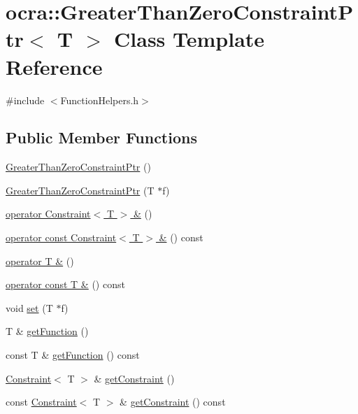 \hypertarget{classocra_1_1GreaterThanZeroConstraintPtr}{}\section{ocra\+:\+:Greater\+Than\+Zero\+Constraint\+Ptr$<$ T $>$ Class Template Reference}
\label{classocra_1_1GreaterThanZeroConstraintPtr}


{\ttfamily \#include $<$Function\+Helpers.\+h$>$}

\subsection*{Public Member Functions}
\begin{DoxyCompactItemize}
\item 
\hyperlink{classocra_1_1GreaterThanZeroConstraintPtr_a37dc1b390edf7f0bbc3d3a8774edff12}{Greater\+Than\+Zero\+Constraint\+Ptr} ()
\item 
\hyperlink{classocra_1_1GreaterThanZeroConstraintPtr_ac1a017fafc95dfc3ac4c814125a5bfac}{Greater\+Than\+Zero\+Constraint\+Ptr} (T $\ast$f)
\item 
\hyperlink{classocra_1_1GreaterThanZeroConstraintPtr_a276bed22a9049cfee41cb189a1956838}{operator Constraint$<$ T $>$ \&} ()
\item 
\hyperlink{classocra_1_1GreaterThanZeroConstraintPtr_a3f9e5f168f83714aae4f725cdfadac67}{operator const Constraint$<$ T $>$ \&} () const
\item 
\hyperlink{classocra_1_1GreaterThanZeroConstraintPtr_a4f84335bff8491be942a23fbf70cc9f8}{operator T \&} ()
\item 
\hyperlink{classocra_1_1GreaterThanZeroConstraintPtr_ad503d58867d41ae403fc1a34d7b844cf}{operator const T \&} () const
\item 
void \hyperlink{classocra_1_1GreaterThanZeroConstraintPtr_a3c6c6625ab65691ed326a0a17b0d9e27}{set} (T $\ast$f)
\item 
T \& \hyperlink{classocra_1_1GreaterThanZeroConstraintPtr_a08864214cedd5b05f5318f29a941693d}{get\+Function} ()
\item 
const T \& \hyperlink{classocra_1_1GreaterThanZeroConstraintPtr_a582cf60ccca16e05849f356592d0efa2}{get\+Function} () const
\item 
\hyperlink{classocra_1_1Constraint}{Constraint}$<$ T $>$ \& \hyperlink{classocra_1_1GreaterThanZeroConstraintPtr_a9ef54456b60a13c1bd518969fc7f3f8b}{get\+Constraint} ()
\item 
const \hyperlink{classocra_1_1Constraint}{Constraint}$<$ T $>$ \& \hyperlink{classocra_1_1GreaterThanZeroConstraintPtr_ab664e8f3cc1d697efbb97d3306ace309}{get\+Constraint} () const
\end{DoxyCompactItemize}


